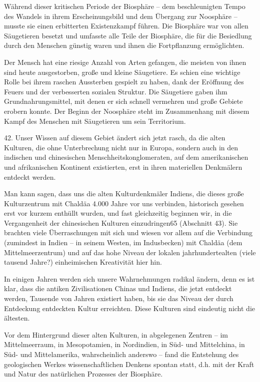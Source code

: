 \documentclass[11pt,a4paper]{book}
\begin{document}
Während dieser kritischen Periode der Biosphäre -- dem beschleunigten Tempo des Wandels in ihrem Erscheinungsbild und dem Übergang zur Noosphäre -- musste sie einen erbitterten Existenzkampf führen. Die Biosphäre war von allen Säugetieren besetzt und umfasste alle Teile der Biosphäre, die für die Besiedlung durch den Menschen günstig waren und ihnen die Fortpflanzung ermöglichten. 

Der Mensch hat eine riesige Anzahl von Arten gefangen, die meisten von ihnen sind heute ausgestorben, große und kleine Säugetiere. Es schien eine wichtige Rolle bei ihrem raschen Aussterben gespielt zu haben, dank der Eröffnung des Feuers und der verbesserten sozialen Struktur. Die Säugetiere gaben ihm Grundnahrungsmittel, mit denen er sich schnell vermehren und große Gebiete erobern konnte. Der Beginn der Noosphäre steht im Zusammenhang mit diesem Kampf des Menschen mit Säugetieren um sein Territorium. 

42. Unser Wissen auf diesem Gebiet ändert sich jetzt rasch, da die alten Kulturen, die ohne Unterbrechung nicht nur in Europa, sondern auch in den indischen und chinesischen Menschheitskonglomeraten, auf dem amerikanischen und afrikanischen Kontinent existierten, erst in ihren materiellen Denkmälern entdeckt werden. 

Man kann sagen, dass uns die alten Kulturdenkmäler Indiens, die dieses große Kulturzentrum mit Chaldäa 4.000 Jahre vor uns verbinden, historisch gesehen erst vor kurzem enthüllt wurden, und fast gleichzeitig beginnen wir, in die Vergangenheit der chinesischen Kulturen einzudringen65 (Abschnitt 43). Sie brachten viele Überraschungen mit sich und wiesen vor allem auf die Verbindung (zumindest in Indien -- in seinem Westen, im Indusbecken) mit Chaldäa (dem Mittelmeerzentrum) und auf das hohe Niveau der lokalen jahrhundertealten (viele tausend Jahre?) einheimischen Kreativität hier hin. 

In einigen Jahren werden sich unsere Wahrnehmungen radikal ändern, denn es ist klar, dass die antiken Zivilisationen Chinas und Indiens, die jetzt entdeckt werden, Tausende von Jahren existiert haben, bis sie das Niveau der durch Entdeckung entdeckten Kultur erreichten. Diese Kulturen sind eindeutig nicht die ältesten. 

Vor dem Hintergrund dieser alten Kulturen, in abgelegenen Zentren -- im Mittelmeerraum, in Mesopotamien, in Nordindien, in Süd- und Mittelchina, in Süd- und Mittelamerika, wahrscheinlich anderswo -- fand die Entstehung des geologischen Werkes wissenschaftlichen Denkens spontan statt, d.h. mit der Kraft und Natur des natürlichen Prozesses der Biosphäre. 
\end{document}

